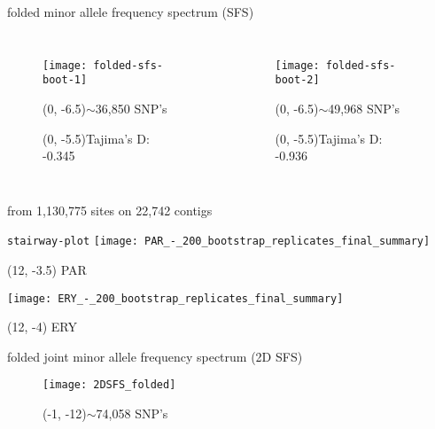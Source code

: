 \documentclass[xcolor=pdftex,dvipsnames,table, handout]{beamer}
\begin{document}
\begin{frame}{folded minor allele frequency spectrum (SFS)}
\scriptsize
\centering
\begin{columns}
\begin{figure}
\texttt{[image: folded-sfs-boot-1]}
\begin{textblock}{6}(0, -6.5)\raggedleft\tiny $\sim$36,850 SNP's\end{textblock}
\begin{textblock}{6}(0, -5.5)\raggedleft\tiny Tajima's D: -0.345\end{textblock}
\end{figure}
\begin{figure}
\texttt{[image: folded-sfs-boot-2]}
\begin{textblock}{6}(0, -6.5)\raggedleft\tiny $\sim$49,968 SNP's\end{textblock}
\begin{textblock}{6}(0, -5.5)\raggedleft\tiny Tajima's D: -0.936\end{textblock}
\end{figure}
\end{columns}
\vskip15pt
from 1,130,775 sites on 22,742 contigs
\end{frame}
%
\begin{frame}{\texttt{stairway-plot}}
\texttt{[image: PAR\_-\_200\_bootstrap\_replicates\_final\_summary]}
\begin{textblock}{10}(12, -3.5) PAR\end{textblock}
\vskip10pt
\texttt{[image: ERY\_-\_200\_bootstrap\_replicates\_final\_summary]}
\begin{textblock}{10}(12, -4) ERY\end{textblock}

\end{frame}
%
\begin{frame}{folded joint minor allele frequency spectrum (2D SFS) }
\begin{figure}
\texttt{[image: 2DSFS\_folded]}
\begin{textblock}{8}(-1, -12)\raggedleft\tiny $\sim$74,058 SNP's\end{textblock}
\end{figure}
\end{frame}
\end{document}
